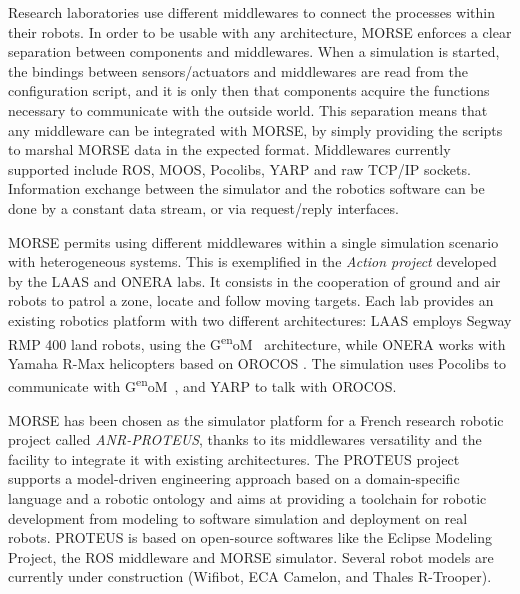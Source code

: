 \documentclass{llncs}
\def\genom{G\textsuperscript{en}oM~}
\newcommand{\gilberto}[1]{\nb{Gilberto}{red}{#1}}
\begin{document}
Research laboratories use different middlewares to connect the processes within their
robots. In order to be usable with any architecture, MORSE enforces a
clear separation between components and middlewares. When a simulation is started,
the bindings between sensors/actuators and middlewares are read from the
configuration script, and it is only then that components acquire the functions
necessary to communicate with the outside world.
This separation means that any middleware can be integrated with MORSE, by
simply providing the scripts to marshal MORSE data in the expected format.
Middlewares currently supported include ROS, MOOS, Pocolibs, YARP and
raw TCP/IP sockets.
Information exchange between the simulator and the robotics software can be
done by a constant data stream, or via request/reply interfaces.

MORSE permits using different middlewares within a single simulation
scenario with heterogeneous systems. This is exemplified in the \emph{Action
project} \cite{6106782} developed by the LAAS and ONERA labs.
It consists in the cooperation of ground and air robots to patrol a zone,
locate and follow moving targets.
Each lab provides an existing robotics platform with two different
architectures: LAAS employs Segway RMP 400 land robots, using the \genom
\cite{MALLET-2011-599677} architecture, while ONERA works with Yamaha R-Max
helicopters based on OROCOS \cite{orocos2003}. The simulation uses Pocolibs to
communicate with \genom, and YARP to talk with OROCOS.


MORSE has been chosen as the simulator platform for a French research
robotic project called \emph{ANR-PROTEUS}, thanks to
its middlewares versatility and the facility to integrate it with
existing architectures.
The PROTEUS project supports a model-driven engineering approach based on a
domain-specific language and a robotic ontology \cite{Dhouib:2011zr} and aims at
providing a toolchain for robotic development from modeling to software
simulation and deployment on real robots. PROTEUS is based on open-source
softwares like the Eclipse Modeling Project, the ROS middleware and MORSE
simulator. Several robot models are currently under construction (Wifibot,
ECA Camelon, and Thales R-Trooper).
\end{document}
